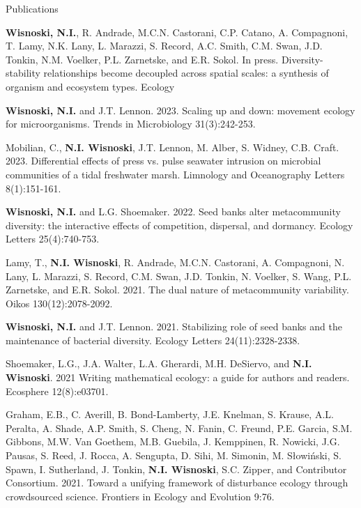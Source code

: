 \documentclass{resume} %
\begin{document}
\begin{rSection}{Publications}


\begin{etaremune}
\item {\bf Wisnoski, N.I.}, R. Andrade, M.C.N. Castorani, C.P. Catano, A. Compagnoni, T. Lamy, N.K. Lany, L. Marazzi, S. Record, A.C. Smith, C.M. Swan, J.D. Tonkin, N.M. Voelker, P.L. Zarnetske, and E.R. Sokol. In press. Diversity-stability relationships become decoupled across spatial scales: a synthesis of organism and ecosystem types. Ecology

\item {\bf Wisnoski, N.I.} and J.T. Lennon. 2023. Scaling up and down: movement ecology for microorganisms. Trends in Microbiology 31(3):242-253.

\item Mobilian, C., {\bf N.I. Wisnoski}, J.T. Lennon, M. Alber, S. Widney, C.B. Craft. 2023. Differential effects of press vs. pulse seawater intrusion on microbial communities of a tidal freshwater marsh. Limnology and Oceanography Letters 8(1):151-161.

\item {\bf Wisnoski, N.I.} and L.G. Shoemaker. 2022. Seed banks alter metacommunity diversity: the interactive effects of competition, dispersal, and dormancy. Ecology Letters 25(4):740-753.

\item Lamy, T., {\bf N.I. Wisnoski}, R. Andrade, M.C.N. Castorani, A. Compagnoni, N. Lany, L. Marazzi, S. Record, C.M. Swan, J.D. Tonkin, N. Voelker, S. Wang, P.L. Zarnetske, and E.R. Sokol. 2021. The dual nature of metacommunity variability. Oikos 130(12):2078-2092.

\item {\bf Wisnoski, N.I.} and J.T. Lennon. 2021. Stabilizing role of seed banks and the maintenance of bacterial diversity. Ecology Letters 24(11):2328-2338.

\item Shoemaker, L.G., J.A. Walter, L.A. Gherardi, M.H. DeSiervo, and {\bf N.I. Wisnoski}. 2021 Writing mathematical ecology: a guide for authors and readers. Ecosphere 12(8):e03701.

\item Graham, E.B., C. Averill, B. Bond-Lamberty, J.E. Knelman, S. Krause, A.L. Peralta, A. Shade, A.P. Smith, S. Cheng, N. Fanin, C. Freund, P.E. Garcia, S.M. Gibbons, M.W. Van Goethem, M.B. Guebila, J. Kemppinen, R. Nowicki, J.G. Pausas, S. Reed, J. Rocca, A. Sengupta, D. Sihi, M. Simonin, M. Słowiński, S. Spawn, I. Sutherland, J. Tonkin, {\bf N.I. Wisnoski}, S.C. Zipper, and Contributor Consortium. 2021. Toward a unifying framework of disturbance ecology through crowdsourced science. Frontiers in Ecology and Evolution 9:76.


\end{etaremune}
\end{rSection}
\end{document}
